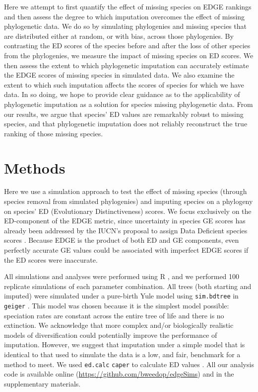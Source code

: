 \documentclass[12pt,english]{article}
\begin{document}
Here we attempt to first quantify the effect of missing species on EDGE rankings
and then assess the degree to which imputation overcomes the effect of missing
phylogenetic data. We do so by simulating phylogenies and missing species that
are distributed either at random, or with bias, across those phylogenies. By
contrasting the ED scores of the species before and after the loss of other
species from the phylogenies, we measure the impact of missing species on ED
scores. We then assess the extent to which phylogenetic imputation can
accurately estimate the EDGE scores of missing species in simulated data. We
also examine the extent to which such imputation affects the scores of species
for which we have data. In so doing, we hope to provide clear guidance as to the
applicability of phylogenetic imputation as a solution for species missing
phylogenetic data. From our results, we argue that species' ED values are
remarkably robust to missing species, and that phylogenetic imputation does not
reliably reconstruct the true ranking of those missing species.

\section*{Methods}

Here we use a simulation approach to test the effect of missing species (through
species removal from simulated phylogenies) and imputing species on a phylogeny
on species' ED (Evolutionary Distinctiveness) scores. We focus exclusively on
the ED-component of the EDGE metric, since uncertainty in species GE scores has
already been addressed by the IUCN's proposal to assign Data Deficient species
scores \autocite{Iucn2001, Iucn2008}. Because EDGE is the product of both ED and
GE components, even perfectly accurate GE values could
be associated with imperfect EDGE scores if the ED scores were inaccurate.


All simulations and analyses were performed using R \autocite[version
3.4.0;][]{R2017}, and we performed 100 replicate simulations of each parameter
combination. All trees (both starting and imputed) were simulated under a
pure-birth Yule model using \texttt{sim.bdtree} in \texttt{geiger}
\autocite[setting parameters \texttt{b=1} and \texttt{d=0};][]{Pennell2014}.
This model was chosen because it is the simplest model possible: speciation
rates are constant across the entire tree of life and there is no extinction. We
acknowledge that more complex and/or biologically realistic models of
diversification could potentially improve the performance of imputation.
However, we suggest that imputation under a simple model that is identical to
that used to simulate the data is a low, and fair, benchmark for a method to
meet. We used \texttt{ed.calc} \texttt{caper} to calculate ED values
\autocite{Orme2013}. All our analysis code is available online
(\url{https://github.com/bweedop/edgeSims}) and in the supplementary materials.
\end{document}
